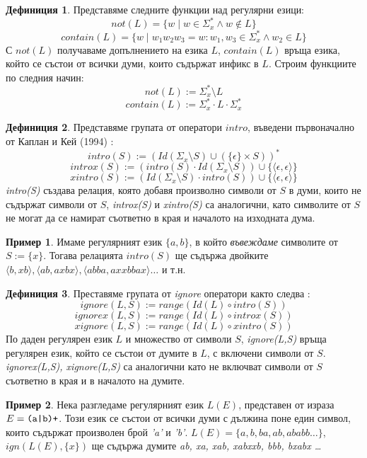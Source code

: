 \documentclass[12pt, oneside]{article}
\theoremstyle{definition}
\newtheorem{definition}{Дефиниция}[section]
\newtheorem{example}{Пример}[section]
\begin{document}
\begin{definition}
	Представяме следните функции над регулярни езици:
	\[ not(L) = \{ w \mid w \in \Sigma_x^* \land w \notin L \} \]
	\[ contain(L) = \{ w \mid w_1w_2w_3 = w: w_1, w_3 \in \Sigma_x^* \land w_2 \in L \} \]
	С \( not(L) \) получаваме допълнението на езика \(L\), \( contain(L) \) връща езика, който се състои от всички думи, които съдържат инфикс в \(L\). Строим функциите по следния начин:
	\[ not(L) := \Sigma_x^* \setminus L \]
	\[ contain(L) := \Sigma_x^* \cdot L \cdot \Sigma_x^* \]
\end{definition}

\begin{definition}
	Представяме групата от оператори \(intro\), въведени първоначално от Каплан и Кей (1994) \cite{Kaplan&Kay:94}:
	\[ intro(S) := (Id(\Sigma_x \setminus S) \cup (\{\epsilon\} \times S))^* \]
	\[ introx(S) := (intro(S) \cdot Id(\Sigma_x \setminus S)) \cup \{\langle \epsilon, \epsilon \rangle \} \]
	\[ xintro(S) := (Id(\Sigma_x \setminus S) \cdot intro(S)) \cup \{\langle \epsilon, \epsilon \rangle \} \]
	\emph{intro(S)} създава релация, която добавя произволно символи от \(S\) в думи, които не съдържат символи от \(S\), \emph{introx(S)} и \emph{xintro(S)} са аналогични, като символите от \(S\) не могат да се намират съответно в края и началото на изходната дума.
\end{definition}

\begin{example}
	Имаме регулярният език \( \{a,b\} \), в който \emph{въвеждаме} символите от \(S := \{ x \}\). Тогава релацията \(intro(S)\) ще съдържа двойките \( \langle b, xb \rangle, \langle ab, axbx \rangle, \langle abba, axxbbax \rangle \dots \) и т.н.
\end{example}

\begin{definition}
	Преставяме групата от \emph{ignore} оператори както следва \cite{Kaplan&Kay:94}:
	\[ ignore(L,S) := range(Id(L) \circ intro(S)) \]
	\[ ignorex(L,S) := range(Id(L) \circ introx(S)) \]
	\[ xignore(L,S) := range(Id(L) \circ xintro(S)) \]
	По даден регулярен език \(L\) и множество от символи \(S\), \emph{ignore(L,S)} връща регулярен език, който се състои от думите в \(L\), с включени символи от \(S\). \emph{ignorex(L,S), xignore(L,S)} са аналогични като не включват символи от \(S\) съответно в края и в началото на думите.	
\end{definition}

\begin{example}
	Нека разгледаме регулярният език \(L(E)\), представен от израза \( E = \verb/(a|b)+/ \). Този език се състои от всички думи с дължина поне един символ, които съдържат произволен брой \emph{'a'} и \emph{'b'}. \( L(E) = \{a, b, ba, ab, ababb \dots \} \), \( ign(L(E), \{x\}) \) ще съдържа думите \emph{ab, xa, xab, xabxxb, bbb, bxabx \dots }
\end{example}
\end{document}
